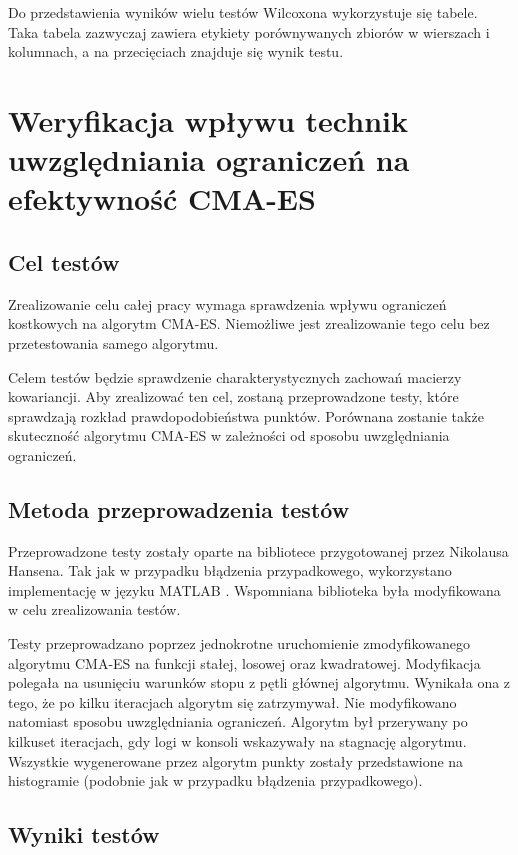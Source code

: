 \documentclass{mini}
\newcommand{\CMAES}{\mbox{CMA-ES}}
\begin{document}
Do przedstawienia wyników wielu testów Wilcoxona wykorzystuje się tabele. Taka tabela zazwyczaj zawiera etykiety porównywanych zbiorów w wierszach i kolumnach, a na przecięciach znajduje się wynik testu.

\pagebreak

\section{Weryfikacja wpływu technik uwzględniania ograniczeń na efektywność CMA-ES}

\subsection{Cel testów}
Zrealizowanie celu całej pracy wymaga sprawdzenia wpływu ograniczeń kostkowych na algorytm \CMAES. Niemożliwe jest zrealizowanie tego celu bez przetestowania samego algorytmu.

Celem testów będzie sprawdzenie charakterystycznych zachowań macierzy kowariancji. Aby zrealizować ten cel, zostaną przeprowadzone testy, które sprawdzają rozkład prawdopodobieństwa punktów. Porównana zostanie także skuteczność algorytmu CMA-ES w zależności od sposobu uwzględniania ograniczeń.

\subsection{Metoda przeprowadzenia testów}
Przeprowadzone testy zostały oparte na bibliotece przygotowanej przez Nikolausa Hansena. Tak jak w przypadku błądzenia przypadkowego, wykorzystano implementację w języku MATLAB \cite{cmaes_code}. Wspomniana biblioteka była modyfikowana w celu zrealizowania testów.

Testy przeprowadzano poprzez jednokrotne uruchomienie zmodyfikowanego algorytmu CMA-ES na funkcji stałej, losowej oraz kwadratowej. Modyfikacja polegała na usunięciu warunków stopu z pętli głównej algorytmu. Wynikała ona z tego, że po kilku iteracjach algorytm się zatrzymywał. Nie modyfikowano natomiast sposobu uwzględniania ograniczeń. Algorytm był przerywany po kilkuset iteracjach, gdy logi w konsoli wskazywały na stagnację algorytmu. Wszystkie wygenerowane przez algorytm punkty zostały przedstawione na histogramie (podobnie jak w przypadku błądzenia przypadkowego).

\subsection{Wyniki testów}
\end{document}
